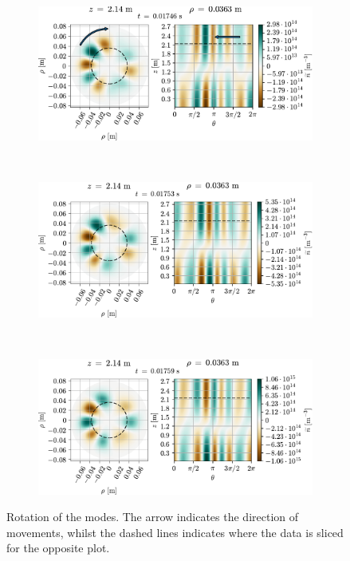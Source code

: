 %
{
\begin{figure}[htbp]
    \vspace*{-1cm}
    \centering
    \begin{subfigure}[h]{1.00\textwidth}
        \centering
        \includegraphics{fig/results/rotModes/n-perpPol-2D-fluct-0_rot}
        \label{fig:rot1}
    \end{subfigure}%
    \\
    \begin{subfigure}[h]{1.00\textwidth}
        \centering
        \includegraphics{fig/results/rotModes/n-perpPol-2D-fluct-1}
        \label{fig:rot2}
    \end{subfigure}
    \\
    \begin{subfigure}[h]{1.00\textwidth}
        \centering
        \includegraphics{fig/results/rotModes/n-perpPol-2D-fluct-2}
        \label{fig:rot3}
    \end{subfigure}
    \caption{Rotation of the modes.
        The arrow indicates the direction of movements, whilst the dashed lines indicates where the data is sliced for the opposite plot.
    }
    \label{fig:modeRotation}
\end{figure}
}
%

